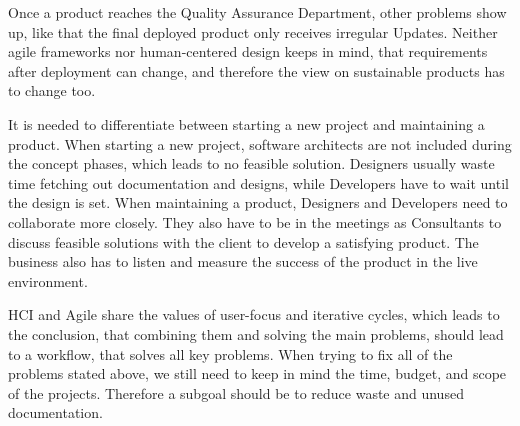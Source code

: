 {Once a product reaches the Quality Assurance Department, other problems show up, like that the final deployed product only receives irregular Updates. Neither agile frameworks nor human-centered design keeps in mind, that requirements after deployment can change, and therefore the view on sustainable products has to change too\cite[p. 18, pp. 30-31]{ratcliffe2011agile}.

It is needed to differentiate between starting a new project and maintaining a product. When starting a new project, software architects are not included during the concept phases, which leads to no feasible solution. Designers usually waste time fetching out documentation and designs, while Developers have to wait until the design is set. When maintaining a product, Designers and Developers need to collaborate more closely. They also have to be in the meetings as Consultants to discuss feasible solutions with the client to develop a satisfying product. The business also has to listen and measure the success of the product in the live environment.

HCI and Agile share the values of user-focus and iterative cycles, which leads to the conclusion, that combining them and solving the main problems, should lead to a workflow, that solves all key problems\citep{HumanCom2:online}. When trying to fix all of the problems stated above, we still need to keep in mind the time, budget, and scope of the projects. Therefore a subgoal should be to reduce waste and unused documentation.
}

